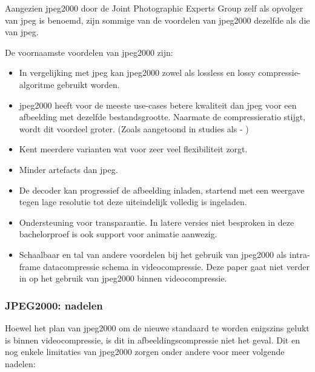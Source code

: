 Aangezien \gls{jpeg2000} door de Joint Photographic Experts Group zelf als opvolger van \gls{jpeg} is benoemd, zijn sommige van de voordelen van \gls{jpeg2000} dezelfde als die van \gls{jpeg}.

De voornaamste voordelen van \gls{jpeg2000} zijn:

\begin{itemize}
	\item In vergelijking met \gls{jpeg} kan \gls{jpeg2000} zowel als \gls{lossless} en \gls{lossy} \gls{compressie-algoritme} gebruikt worden.
	
	\item \gls{jpeg2000} heeft voor de meeste \glspl{use-case} betere kwaliteit dan \gls{jpeg} voor een afbeelding met dezelfde bestandsgrootte. Naarmate de compressieratio stijgt, wordt dit voordeel groter. (Zoals aangetoond in studies als  - \cite{jpegvsjpeg2000quality})
	
	\item Kent meerdere varianten wat voor zeer veel flexibiliteit zorgt.
	
	\item Minder \glspl{artefact} dan \gls{jpeg}.
	
	\item De  \gls{decoder} kan progressief de afbeelding inladen, startend met een weergave tegen lage resolutie tot deze uiteindelijk volledig is ingeladen.
	
	\item Ondersteuning voor transparantie. In latere versies niet besproken in deze bachelorproef is ook support voor animatie aanwezig.
	
	\item Schaalbaar en tal van andere voordelen bij het gebruik van \gls{jpeg2000} als \gls{intra-frame} \gls{datacompressie} schema in \gls{videocompressie}. Deze paper gaat niet verder in op het gebruik van \gls{jpeg2000} binnen \gls{videocompressie}.
\end{itemize}

\subsubsection{JPEG2000: nadelen}
\label{sec:afbeeldingscompressie-jpeg2000-nadelen}

Hoewel het plan van \gls{jpeg2000} om de nieuwe standaard te worden enigszins gelukt is binnen \gls{videocompressie}, is dit in \gls{afbeeldingscompressie} niet het geval. Dit en nog enkele limitaties van \gls{jpeg2000} zorgen onder andere voor meer volgende nadelen:

